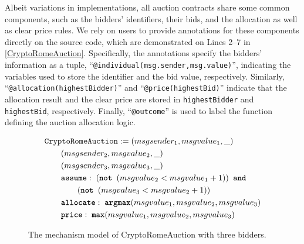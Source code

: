 Albeit variations in implementations, all auction contracts share some common components, such as
the bidders' identifiers, their bids, and the allocation as well as clear price rules.
We rely on users to provide annotations for these components directly on the source code, which are
demonstrated on Lines 2--7 in \cref{CryptoRomeAuction}.
Specifically, the annotations specify the bidders' information as a tuple,
``\texttt{@individual(msg.sender,msg.value)}'', indicating the variables used to store the
identifier and the bid value, respectively.
Similarly, ``\texttt{@allocation(highestBidder)}'' and ``\texttt{@price(highestBid)}'' indicate
that the allocation result and the clear price are stored in \texttt{highestBidder} and
\texttt{highestBid}, respectively.
Finally, ``\texttt{@outcome}'' is used to label the function defining the auction allocation logic.

\begin{figure}[t]
  \small
  \begin{align*}
  & \texttt{CryptoRomeAuction} := (msgsender_1, msgvalue_1, \_ ) \\
  & \qquad (msgsender_2, msgvalue_2, \_ ) \\
  & \qquad (msgsender_3, msgvalue_3, \_ ) \\
  & \qquad \texttt{\textbf{assume}}:\; (\texttt{\textbf{not }} (msgvalue_2 < msgvalue_1 + 1)) \texttt{\textbf{ and }} \\
  & \qquad\qquad (\texttt{\textbf{not }} (msgvalue_3 < msgvalue_2 + 1)) \\
  & \qquad \texttt{\textbf{allocate}}:\; \texttt{\textbf{argmax}}(msgvalue_1,
  msgvalue_2, msgvalue_3)\\
  & \qquad \texttt{\textbf{price}}:\; \texttt{\textbf{max}}(msgvalue_1, msgvalue_2,
  msgvalue_3)
  \end{align*}%
  \caption{The mechanism model of CryptoRomeAuction with three bidders.}\label{Crypto_Mechanism}
\end{figure}

